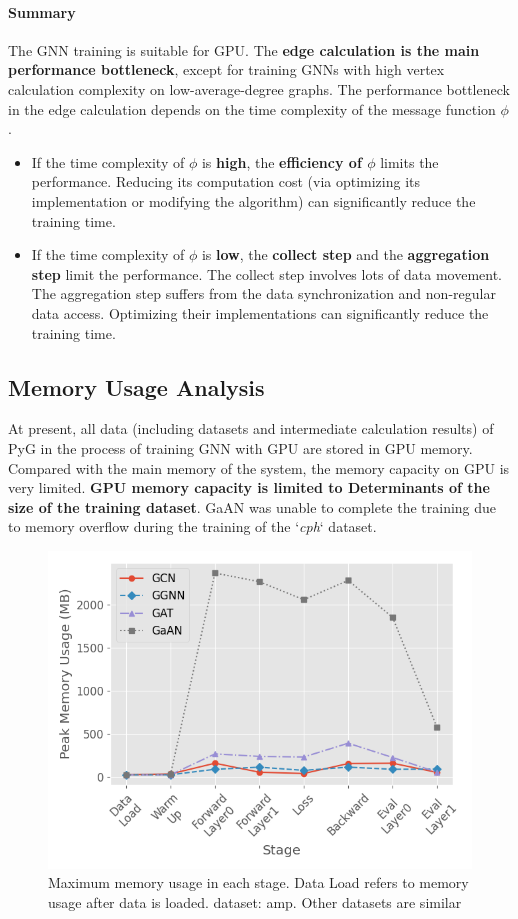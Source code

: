 \paragraph{Summary}
The GNN training is suitable for GPU.
The \textbf{edge calculation is the main performance bottleneck}, except for training GNNs with high vertex calculation complexity on low-average-degree graphs.
The performance bottleneck in the edge calculation depends on the time complexity of the message function $\phi$.
\begin{itemize}
    \item If the time complexity of $\phi$ is \textbf{high}, the \textbf{efficiency of $\phi$} limits the performance. Reducing its computation cost (via optimizing its implementation or modifying the algorithm) can significantly reduce the training time.
    \item If the time complexity of $\phi$ is \textbf{low}, the \textbf{collect step} and the \textbf{aggregation step} limit the performance. The collect step involves lots of data movement. The aggregation step suffers from the data synchronization and non-regular data access. Optimizing their implementations can significantly reduce the training time.
\end{itemize}

\subsection{Memory Usage Analysis}

At present, all data (including datasets and intermediate calculation results) of PyG in the process of training GNN with GPU
are stored in GPU memory. Compared with the main memory of the system, the memory capacity on GPU is very limited.
\textbf{GPU memory capacity is limited to Determinants of the size of the training dataset}.
GaAN was unable to complete the training due to memory overflow during the training of the `\textit{cph}` dataset.

\begin{figure}
    \centering
    \includegraphics[width=0.7\columnwidth]{figs/experiments/exp_memory_usage_stage_amp.png}
    \caption{Maximum memory usage in each stage. Data Load refers to memory usage after data is loaded. dataset: amp. Other datasets are similar}
    \label{fig:exp_memory_usage_stage_amp}
\end{figure}

